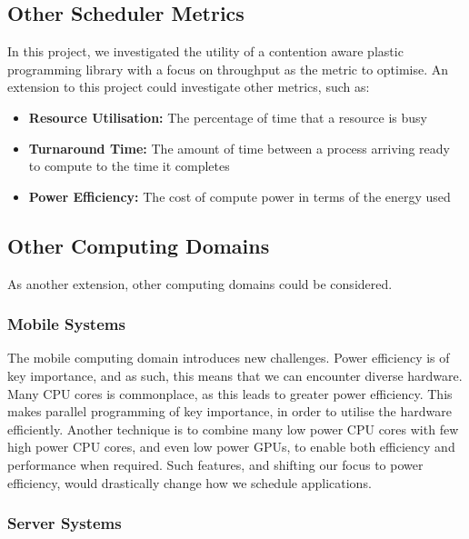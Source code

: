 \subsection{Other Scheduler Metrics}
\label{section:conclusion_and_future_work:other_scheduler_metrics}

In this project, we investigated the utility of a contention aware plastic programming library with a focus on throughput as the metric to optimise. An extension to this project could investigate other metrics, such as:

\begin{itemize}
    \item \textbf{Resource Utilisation:} The percentage of time that a resource is busy
    \item \textbf{Turnaround Time:}      The amount of time between a process arriving ready to compute to the time it completes
    \item \textbf{Power Efficiency:}     The cost of compute power in terms of the energy used
\end{itemize}



\subsection{Other Computing Domains}
\label{section:conclusion_and_future_work:other_computing_domains}

As another extension, other computing domains could be considered.

\subsubsection{Mobile Systems}
\label{section:conclusion_and_future_work:mobile_systems}

The mobile computing domain introduces new challenges. Power efficiency is of key importance, and as such, this means that we can encounter diverse hardware. Many CPU cores is commonplace, as this leads to greater power efficiency. This makes parallel programming of key importance, in order to utilise the hardware efficiently. Another technique is to combine many low power CPU cores with few high power CPU cores, and even low power GPUs, to enable both efficiency and performance when required. Such features, and shifting our focus to power efficiency, would drastically change how we schedule applications.



\subsubsection{Server Systems}
\label{section:conclusion_and_future_work:server_systems}

